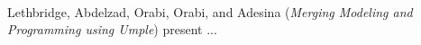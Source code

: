 

\ \hline \ %

Lethbridge, Abdelzad, Orabi, Orabi, and Adesina
\cite{isola-2016-lethbridge}
({\em Merging Modeling and Programming using Umple})
present ...


